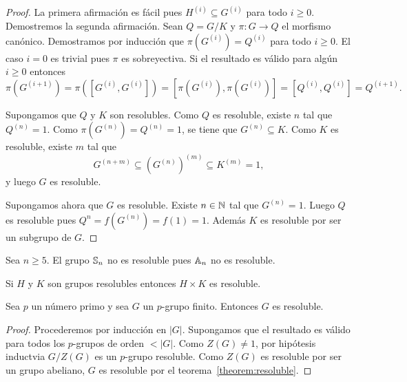 \begin{proof}
	La primera afirmación es fácil pues $H^{(i)}\subseteq G^{(i)}$ para
	todo $i\geq0$. Demostremos la segunda afirmación. Sean $Q=G/K$ y $\pi\colon G\to Q$ el
	morfismo canónico. Demostramos por inducción que $\pi(G^{(i)})=Q^{(i)}$ para todo
	$i\geq0$. El caso $i=0$ es trivial pues $\pi$ es sobreyectiva. Si el
	resultado es válido para algún $i\geq0$ entonces
	\[
		\pi(G^{(i+1)})=\pi([G^{(i)},G^{(i)}])=[\pi(G^{(i)}),\pi(G^{(i)})]=[Q^{(i)},Q^{(i)}]=Q^{(i+1)}.
	\]

	Supongamos que $Q$ y $K$ son resolubles. Como $Q$ es resoluble, 
	existe $n$ tal que $Q^{(n)}=1$.
	Como $\pi(G^{(n)})=Q^{(n)}=1$, se tiene que $G^{(n)}\subseteq K$. Como $K$
	es resoluble, existe $m$ tal que
	\[
		G^{(n+m)}\subseteq (G^{(n)})^{(m)}\subseteq K^{(m)}=1,
	\]
	y luego $G$ es resoluble. 

	Supongamos ahora que $G$ es resoluble. Existe $n\in\mathbb{N}$ tal que $G^{(n)}=1$.
	Luego $Q$ es resoluble pues $Q^{n}=f(G^{(n)})=f(1)=1$. Además $K$ es
	resoluble por ser un subgrupo de $G$. 
\end{proof}

\begin{example}
	Sea $n\geq5$. El grupo $\mathbb{S}_n$ no es resoluble pues $\mathbb{A}_n$ no es
	resoluble.
\end{example}

\begin{example}
	Si $H$ y $K$ son grupos resolubles entonces $H\times K$ es resoluble.
\end{example}

\begin{proposition}
	Sea $p$ un número primo y sea $G$ un $p$-grupo finito. Entonces $G$ es
	resoluble.
\end{proposition}

\begin{proof}
	Procederemos por inducción en $|G|$. Supongamos que el resultado es válido
	para todos los $p$-grupos de orden $<|G|$. Como $Z(G)\ne1$, por hipótesis
	inductvia $G/Z(G)$ es un $p$-grupo resoluble.  Como $Z(G)$ es resoluble por
	ser un grupo abeliano, $G$ es resoluble por el
	teorema~\ref{theorem:resoluble}. 
\end{proof}

